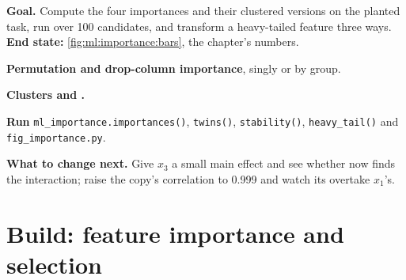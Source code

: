 \begin{tutorial}
\textbf{Goal.} Compute the four importances and their clustered versions on the planted task, run 
over 100 candidates, and transform a heavy-tailed feature three ways. \textbf{End state:} \cref{fig:ml:importance:bars},
the chapter's numbers.
\begin{tutsteps}
\item \textbf{Permutation and drop-column importance}, singly or by group.
\label{lst:ml:importance:perm}
\item \textbf{Clusters and .}
\label{lst:ml:importance:stab}
\item \textbf{Run} \texttt{ml\_importance.importances()}, \texttt{twins()}, \texttt{stability()},
\texttt{heavy\_tail()} and \texttt{fig\_importance.py}.
\end{tutsteps}
\textbf{What to change next.} Give $x_3$ a small main effect and see whether  now finds the
interaction; raise the copy's correlation to 0.999 and watch its  overtake $x_1$'s.
\end{tutorial}

\section{Build: feature importance and selection}\label{bld:ml:feature-engineering-selection-and-importance:featimp}

